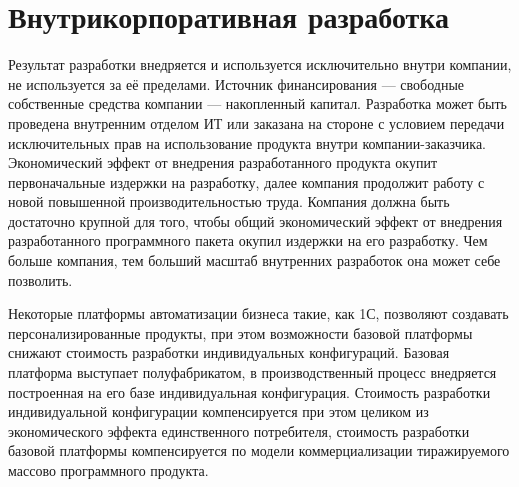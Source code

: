 \documentclass{article}
\begin{document}
\section*{Внутрикорпоративная разработка}

Результат разработки внедряется и используется исключительно внутри компании, не используется за её пределами. Источник финансирования — свободные собственные средства компании — накопленный капитал. Разработка может быть проведена внутренним отделом ИТ или заказана на стороне с условием передачи исключительных прав на использование продукта внутри компании-заказчика. Экономический эффект от внедрения разработанного продукта окупит первоначальные издержки на разработку, далее компания продолжит работу с новой повышенной производительностью труда. Компания должна быть достаточно крупной для того, чтобы общий экономический эффект от внедрения разработанного программного пакета окупил издержки на его разработку. Чем больше компания, тем больший масштаб внутренних разработок она может себе позволить.

Некоторые платформы автоматизации бизнеса такие, как 1С, позволяют создавать персонализированные продукты, при этом возможности базовой платформы снижают стоимость разработки индивидуальных конфигураций. Базовая платформа выступает полуфабрикатом, в производственный процесс внедряется построенная на его базе индивидуальная конфигурация. Стоимость разработки индивидуальной конфигурации компенсируется при этом целиком из экономического эффекта единственного потребителя, стоимость разработки базовой платформы компенсируется по модели коммерциализации тиражируемого массово программного продукта.
\end{document}
